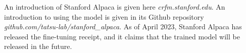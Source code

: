 An introduction of Stanford Alpaca is given here \textit{crfm.stanford.edu}. An introduction to using the model is given in its Github repository \textit{github.com/tatsu-lab/stanford\_alpaca}. As of April 2023, Stanford Alpaca has released the fine-tuning receipt, and it claims that the trained model will be released in the future.



















